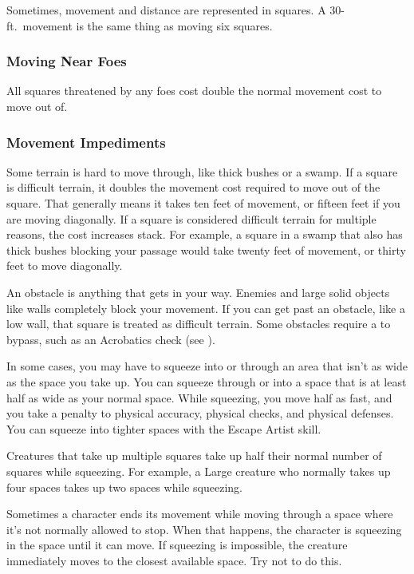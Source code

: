             Sometimes, movement and distance are represented in squares.
            A 30-ft.\ movement is the same thing as moving six squares.

        \subsubsection{Moving Near Foes}\label{Moving Near Foes}
            All squares threatened by any foes cost double the normal movement cost to move out of.

        \subsubsection{Movement Impediments}

            \label{Difficult Terrain}
            Some terrain is hard to move through, like thick bushes or a swamp. If a square is difficult terrain, it doubles the movement cost required to move out of the square. That generally means it takes ten feet of movement, or fifteen feet if you are moving diagonally. If a square is considered difficult terrain for multiple reasons, the cost increases stack. For example, a square in a swamp that also has thick bushes blocking your passage would take twenty feet of movement, or thirty feet to move diagonally.

            An obstacle is anything that gets in your way. Enemies and large solid objects like walls completely block your movement. If you can get past an obstacle, like a low wall, that square is treated as difficult terrain. Some obstacles require a  to bypass, such as an Acrobatics check (see ).

            \label{Squeezing}
            In some cases, you may have to squeeze into or through an area that isn't as wide as the space you take up. You can squeeze through or into a space that is at least half as wide as your normal space. While squeezing, you move half as fast, and you take a  penalty to physical accuracy, physical checks, and physical defenses. You can squeeze into tighter spaces with the Escape Artist skill.

            Creatures that take up multiple squares take up half their normal number of squares while squeezing. For example, a Large creature who normally takes up four spaces takes up two spaces while squeezing.

             Sometimes a character ends its movement while moving through a space where it's not normally allowed to stop. When that happens, the character is squeezing in the space until it can move. If squeezing is impossible, the creature immediately moves to the closest available space. Try not to do this.

